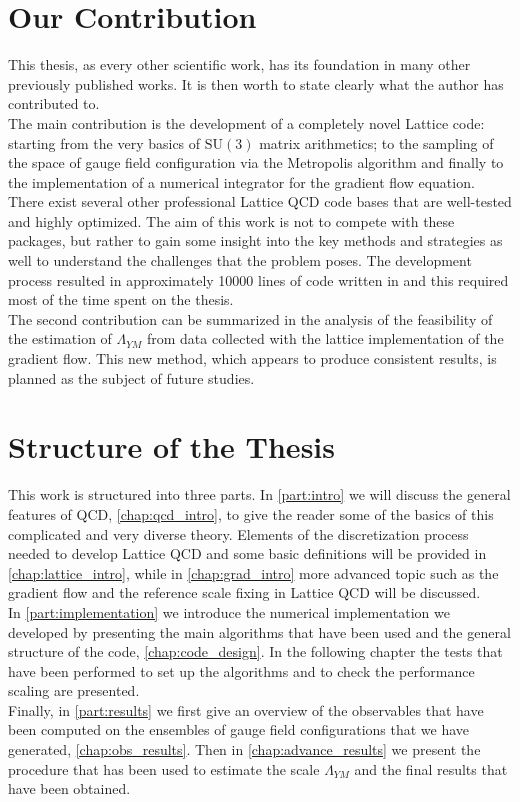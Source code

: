 \section{Our Contribution}
This thesis, as every other scientific work, has its foundation in many other previously published works. It is then worth to state clearly what the author has contributed to. \\
The main contribution is the development of a completely novel Lattice code: starting from the very basics of $\mathrm{SU}(3)$ matrix arithmetics; to the sampling of the space of gauge field configuration via the Metropolis algorithm and finally to the implementation of a numerical integrator for the gradient flow equation. \\
There exist several other professional Lattice QCD code bases that are well-tested and highly optimized. The aim of this work is not to compete with these packages, but rather to gain some insight into the key methods and strategies as well to understand the challenges that the problem poses. The development process resulted in approximately 10000 lines of code written in \cpp and this required most of the time spent on the thesis.\\
The second contribution can be summarized in the analysis of the feasibility of the estimation of $\Lambda_{YM}$ from data collected with the lattice implementation of the gradient flow. This new method, which appears to produce consistent results, is planned as the subject of future studies. 


\section{Structure of the Thesis}
This work is structured into three parts. In \cref{part:intro} we will discuss the general features of QCD, \cref{chap:qcd_intro}, to give the reader some of the basics of this complicated and very diverse theory. Elements of the discretization process needed to develop Lattice QCD and some basic definitions will be provided in \cref{chap:lattice_intro}, while in \cref{chap:grad_intro} more advanced topic such as the gradient flow and the reference scale fixing in Lattice QCD will be discussed.  \\
In \cref{part:implementation} we introduce the numerical implementation we developed by presenting the main algorithms that have been used and the general structure of the code, \cref{chap:code_design}. In the following chapter the tests that have been performed to set up the algorithms and to check the performance scaling are presented.\\
Finally, in \cref{part:results} we first give an overview of the observables that have been computed on the ensembles of gauge field configurations that we have generated, \cref{chap:obs_results}. Then  in \cref{chap:advance_results} we present the procedure that has been used to estimate the scale $\Lambda_{YM}$ and the final results that have been obtained. 
